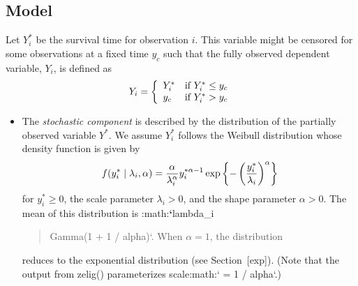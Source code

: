\documentclass[letterpaper,10pt,english]{sphinxmanual}
\begin{document}
\subsection{Model}
\label{vignette:id70}
Let \(Y_i^*\) be the survival time for observation \(i\). This
variable might be censored for some observations at a fixed time
\(y_c\) such that the fully observed dependent variable,
\(Y_i\), is defined as
\begin{gather}
\begin{split}Y_i = \left\{ \begin{array}{ll}
      Y_i^* & \textrm{if }Y_i^* \leq y_c \\
      y_c & \textrm{if }Y_i^* > y_c
    \end{array} \right.\end{split}\notag
\end{gather}\begin{itemize}
\item {} 
The \emph{stochastic component} is described by the distribution of the
partially observed variable \(Y^*\). We assume \(Y_i^*\)
follows the Weibull distribution whose density function is given by
\begin{gather}
\begin{split}f(y_i^*\mid \lambda_i, \alpha) = \frac{\alpha}{\lambda_i^\alpha}
    y_i^{* \alpha-1} \exp \left\{ -\left( \frac{y_i^*}{\lambda_i}
\right)^{\alpha} \right\}\end{split}\notag
\end{gather}
for \(y_i^* \ge 0\), the scale parameter \(\lambda_i > 0\),
and the shape parameter \(\alpha > 0\). The mean of this
distribution is :math:{\color{red}\bfseries{}{}`}lambda\_i
\begin{quote}

Gamma(1 + 1 / alpha){}`. When \(\alpha = 1\), the distribution
\end{quote}

reduces to the exponential distribution (see Section {[}exp{]}). (Note
that the output from zelig() parameterizes
scale:math:{}` = 1 / alpha{}`.)


\end{itemize}
\end{document}
